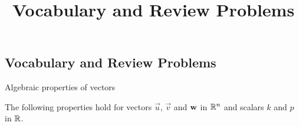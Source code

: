 \documentclass{ximera}
\title{Vocabulary and Review Problems} \license{CC BY-NC-SA 4.0}
\begin{document}
\begin{abstract}
\end{abstract}
\maketitle


\begin{onlineOnly}
\section*{Vocabulary and Review Problems}
\end{onlineOnly}

Algebraic properties of vectors

The following properties hold for vectors $\vec{u}$, $\vec{v}$ and ${\bf w}$ in $\mathbb{R}^n$ and scalars $k$ and $p$ in $\mathbb{R}$.
\end{document}
